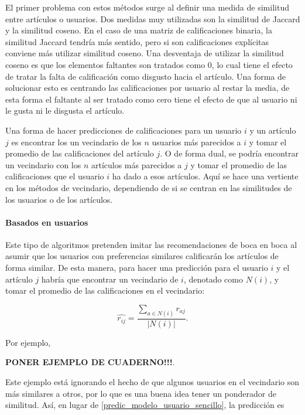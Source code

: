 El primer problema con estos métodos surge al definir una medida de similitud entre artículos o usuarios. Dos medidas muy utilizadas son la similitud de Jaccard y la similitud coseno. En el caso de una matriz de calificaciones binaria, la similitud Jaccard tendría más sentido, pero si son calificaciones explícitas conviene más utilizar similitud coseno. Una desventaja de utilizar la similitud coseno es que los elementos faltantes son tratados como $0$, lo cual tiene el efecto de tratar la falta de calificación como disgusto hacia el artículo. Una forma de solucionar esto es centrando las calificaciones por usuario al restar la media, de esta forma el faltante al ser tratado como cero tiene el efecto de que al usuario ni le gusta ni le disgusta el artículo.

Una forma de hacer predicciones de calificaciones para un usuario $i$ y un artículo $j$ es encontrar los un vecindario de los $n$ usuarios más parecidos a $i$ y tomar el promedio de las calificaciones del artículo $j$. O de forma dual, se podría encontrar un vecindario con los $n$ artículos más parecidos a $j$ y tomar el promedio de las calificaciones que el usuario $i$ ha dado a esos artículos. Aquí se hace una vertiente en los métodos de vecindario, dependiendo de si se centran en las similitudes de los usuarios o de los artículos.

\paragraph{Basados en usuarios}

Este tipo de algoritmos pretenden imitar las recomendaciones de boca en boca al asumir que los usuarios con preferencias similares calificarán los artículos de forma similar. De esta manera, para hacer una predicción para el usuario $i$ y el artículo $j$ habría que encontrar un vecindario de $i$, denotado como $N(i)$, y tomar el promedio de las calificaciones en el vecindario:

\begin{equation}\label{predic_modelo_usuario_sencillo}
 \hat{r_{ij}} = \frac{\sum_{a \in N(i)} r_{aj}}{\vert N(i) \vert}.
\end{equation}

Por ejemplo,

\textbf{PONER EJEMPLO DE CUADERNO!!!}.

Este ejemplo está ignorando el hecho de que algunos usuarios en el vecindario son más similares a otros, por lo que es una buena idea tener un ponderador de similitud. Así, en lugar de \ref{predic_modelo_usuario_sencillo}, la predicción es

